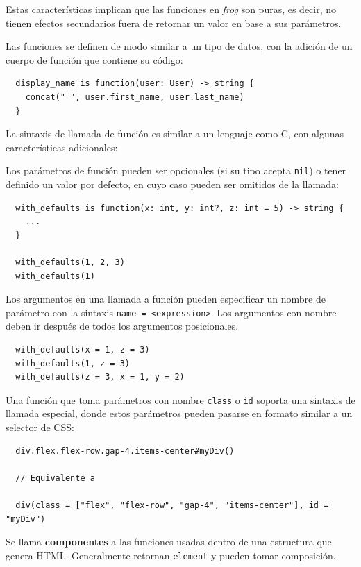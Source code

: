 Estas características implican que las funciones en \textit{frog} son puras, es decir, no tienen efectos secundarios fuera de retornar un valor en base a sus parámetros.

Las funciones se definen de modo similar a un tipo de datos, con la adición de un cuerpo de función que contiene su código:

\small
\begin{verbatim}
  display_name is function(user: User) -> string {
    concat(" ", user.first_name, user.last_name)
  }
\end{verbatim}
\normalsize

La sintaxis de llamada de función es similar a un lenguaje como C, con algunas características adicionales:

Los parámetros de función pueden ser opcionales (si su tipo acepta \texttt{nil}) o tener definido un valor por defecto, en cuyo caso pueden ser omitidos de la llamada:

\small
\begin{verbatim}
  with_defaults is function(x: int, y: int?, z: int = 5) -> string {
    ...
  }

  with_defaults(1, 2, 3)
  with_defaults(1)
\end{verbatim}
\normalsize

Los argumentos en una llamada a función pueden especificar un nombre de parámetro con la sintaxis \texttt{name = <expression>}. Los argumentos con nombre deben ir después de todos los argumentos posicionales.

\small
\begin{verbatim}
  with_defaults(x = 1, z = 3)
  with_defaults(1, z = 3)
  with_defaults(z = 3, x = 1, y = 2)
\end{verbatim}
\normalsize

Una función que toma parámetros con nombre \texttt{class} o \texttt{id} soporta una sintaxis de llamada especial, donde estos parámetros pueden pasarse en formato similar a un selector de CSS:

\small
\begin{verbatim}
  div.flex.flex-row.gap-4.items-center#myDiv()

  // Equivalente a

  div(class = ["flex", "flex-row", "gap-4", "items-center"], id = "myDiv")
\end{verbatim}
\normalsize

Se llama \textbf{componentes} a las funciones usadas dentro de una estructura que genera HTML. Generalmente retornan \texttt{element} y pueden tomar composición.

